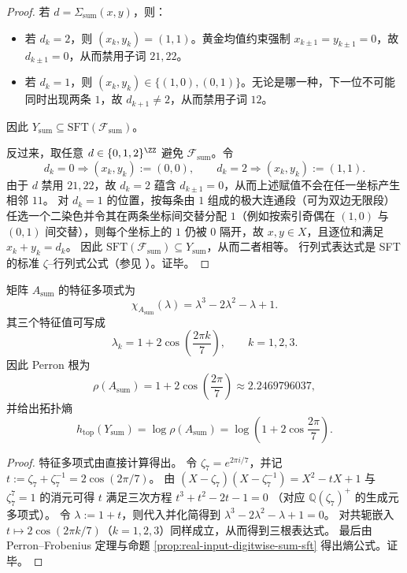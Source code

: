 \begin{proof}
若 $d=\Sigma_{\mathrm{sum}}(x,y)$，则：
\begin{itemize}
  \item 若 $d_k=2$，则 $(x_k,y_k)=(1,1)$。黄金均值约束强制 $x_{k\pm 1}=y_{k\pm 1}=0$，故 $d_{k\pm 1}=0$，从而禁用子词 $21,22$。
  \item 若 $d_k=1$，则 $(x_k,y_k)\in\{(1,0),(0,1)\}$。无论是哪一种，下一位不可能同时出现两条 $1$，故 $d_{k+1}\neq 2$，从而禁用子词 $12$。
\end{itemize}
因此 $Y_{\mathrm{sum}}\subseteq \mathrm{SFT}(\mathcal{F}_{\mathrm{sum}})$。

反过来，取任意 $d\in\{0,1,2\}^{\ZZ}$ 避免 $\mathcal{F}_{\mathrm{sum}}$。令
\[
d_k=0\Rightarrow (x_k,y_k):=(0,0),\qquad
d_k=2\Rightarrow (x_k,y_k):=(1,1).
\]
由于 $d$ 禁用 $21,22$，故 $d_k=2$ 蕴含 $d_{k\pm1}=0$，从而上述赋值不会在任一坐标产生相邻 $11$。
对 $d_k=1$ 的位置，按每条由 $1$ 组成的极大连通段（可为双边无限段）任选一个二染色并令其在两条坐标间交替分配 $1$（例如按索引奇偶在 $(1,0)$ 与 $(0,1)$ 间交替），则每个坐标上的 $1$ 仍被 $0$ 隔开，故 $x,y\in X$，且逐位和满足 $x_k+y_k=d_k$。
因此 $\mathrm{SFT}(\mathcal{F}_{\mathrm{sum}})\subseteq Y_{\mathrm{sum}}$，从而二者相等。
行列式表达式是 SFT 的标准 $\zeta$--行列式公式（参见 \cite{LindMarcus1995,BrinStuck2002}）。证毕。
\end{proof}

\begin{proposition}[第七分圆谱与拓扑熵闭式]\label{prop:real-input-digitwise-sum-cyclotomic-spectrum}
矩阵 $A_{\mathrm{sum}}$ 的特征多项式为
\[
\chi_{A_{\mathrm{sum}}}(\lambda)=\lambda^3-2\lambda^2-\lambda+1.
\]
其三个特征值可写成
\[
\lambda_k=1+2\cos\!\left(\frac{2\pi k}{7}\right),\qquad k=1,2,3.
\]
因此 Perron 根为
\[
\rho(A_{\mathrm{sum}})=1+2\cos\!\left(\frac{2\pi}{7}\right)\approx 2.2469796037,
\]
并给出拓扑熵
\[
h_{\mathrm{top}}(Y_{\mathrm{sum}})=\log \rho(A_{\mathrm{sum}})=\log\!\left(1+2\cos\frac{2\pi}{7}\right).
\]
\end{proposition}

\begin{proof}
特征多项式由直接计算得出。
令 $\zeta_7=e^{2\pi i/7}$，并记 $t:=\zeta_7+\zeta_7^{-1}=2\cos(2\pi/7)$。
由 $(X-\zeta_7)(X-\zeta_7^{-1})=X^2-tX+1$ 与 $\zeta_7^7=1$ 的消元可得 $t$ 满足三次方程
\(
t^3+t^2-2t-1=0
\)
（对应 $\mathbb{Q}(\zeta_7)^+$ 的生成元多项式）。
令 $\lambda:=1+t$，则代入并化简得到
\(
\lambda^3-2\lambda^2-\lambda+1=0
\)。
对共轭嵌入 $t\mapsto 2\cos(2\pi k/7)$（$k=1,2,3$）同样成立，从而得到三根表达式。
最后由 Perron--Frobenius 定理与命题 \ref{prop:real-input-digitwise-sum-sft} 得出熵公式。证毕。
\end{proof}

